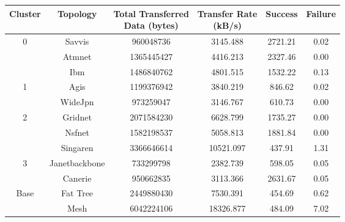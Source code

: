 \begin{tabular}{cccccc}
\toprule
Cluster & Topology & \thead{Total Transferred\\Data (bytes)} & \thead{Transfer Rate\\(kB/s)} & Success & Failure \\
\midrule
\multirow{3}{*}{0}& Savvis & \num{960048736} & 3145.488 & 2721.21 & 0.02 \\
& Atmnet & \num{1365445427} & 4416.213 & 2327.46 & 0.00 \\
& Ibm & \num{1486840762} & 4801.515 & 1532.22 & 0.13 \\ \hline
\multirow{2}{*}{1}& Agis & \num{1199376942} & 3840.219 & 846.62 & 0.02 \\
& WideJpn & \num{973259047} & 3146.767 & 610.73 & 0.00 \\ \hline
\multirow{3}{*}{2}& Gridnet & \num{2071584230} & 6628.799 & 1735.27 & 0.00 \\
& Nsfnet & \num{1582198537} & 5058.813 & 1881.84 & 0.00 \\
& Singaren & \num{3366646614} & 10521.097 & 437.91 & 1.31 \\ \hline
\multirow{2}{*}{3}& Janetbackbone & \num{733299798} & 2382.739 & 598.05 & 0.05 \\
& Canerie & \num{950662835} & 3113.366 & 2631.67 & 0.05 \\ \hline
\multirow{2}{*}{Base}& Fat Tree & \num{2449880430} & 7530.391 & 454.69 & 0.62 \\
& Mesh & \num{6042224106} & 18326.877 & 484.09 & 7.02 \\
\bottomrule
\end{tabular}
